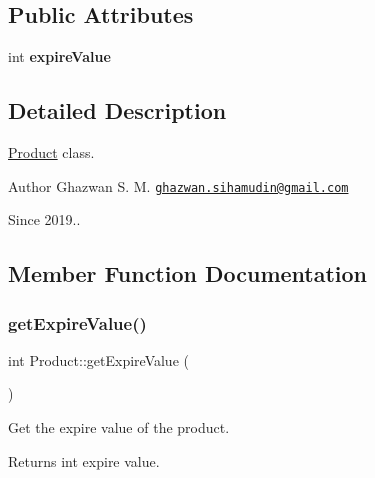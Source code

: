 \subsection*{Public Attributes}
\begin{DoxyCompactItemize}
\item 
\mbox{\label{classProduct_af9e601cc45c4281a39e7f4cbdf4d2a53}} 
int {\bfseries expire\+Value}
\end{DoxyCompactItemize}


\subsection{Detailed Description}
\hyperlink{classProduct}{Product} class.

\begin{DoxyAuthor}{Author}
Ghazwan S. M. \href{mailto:ghazwan.sihamudin@gmail.com}{\tt ghazwan.\+sihamudin@gmail.\+com} 
\end{DoxyAuthor}
\begin{DoxySince}{Since}
2019.. 
\end{DoxySince}


\subsection{Member Function Documentation}
\mbox{\label{classProduct_af1bdfcee872537bb8492160109aa7fb3}} 
\subsubsection{\texorpdfstring{get\+Expire\+Value()}{getExpireValue()}}
{\footnotesize\ttfamily int Product\+::get\+Expire\+Value (\begin{DoxyParamCaption}{ }\end{DoxyParamCaption})}

Get the expire value of the product. \begin{DoxyReturn}{Returns}
int expire value. 
\end{DoxyReturn}
\mbox{\label{classProduct_a3d0f4dafb8cfe6a3d90fd661dc6cb2d0}} 
